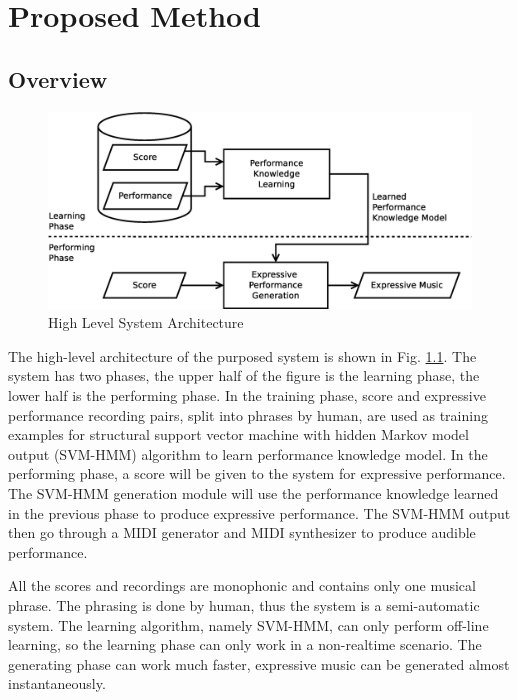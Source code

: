 \chapter{Proposed Method}
\label{chap:proposed}
\section{Overview}
      \begin{figure}[tp]
         \begin{center}
            \includegraphics[width=\textwidth]{fig/high_lev_arch}
         \end{center}
         \caption{High Level System Architecture} 
         \label{fig:flow}
      \end{figure}
The high-level architecture of the purposed system is shown in Fig. \ref{fig:flow}. The system has two phases, the upper half of the figure is the learning phase, the lower half is the performing phase.  In the training phase, score and expressive performance recording pairs, split into phrases by human, are used as training examples for structural support vector machine with hidden Markov model output (SVM-HMM) algorithm to learn performance knowledge model. In the performing phase, a score will be given to the system for expressive performance. The SVM-HMM generation module will use the performance knowledge learned in the previous phase to produce expressive performance. The SVM-HMM output then go through a MIDI generator and MIDI synthesizer to produce audible performance.

All the scores and recordings are monophonic and contains only one musical phrase. The phrasing is done by human, thus the system is a semi-automatic system. The learning algorithm, namely SVM-HMM, can only perform off-line learning, so the learning phase can only work in a non-realtime scenario. The generating phase can work much faster, expressive music can be generated almost instantaneously. 

